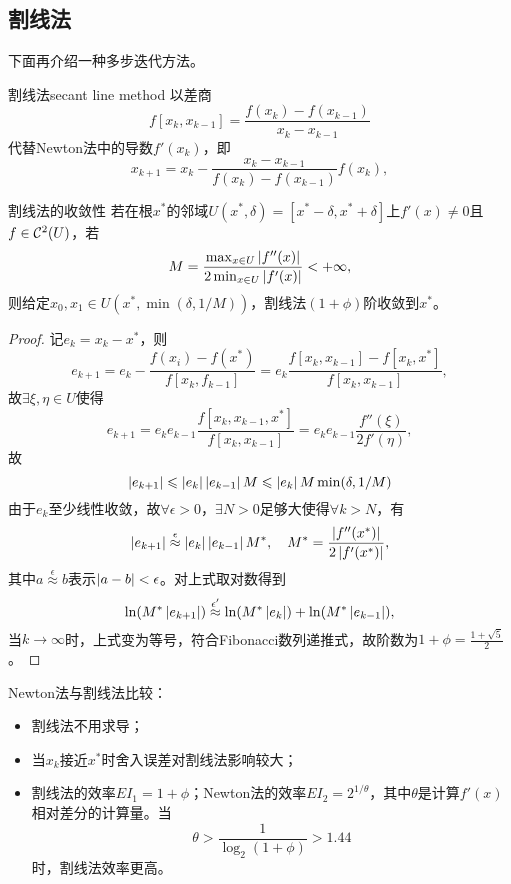 \subsection{割线法}

下面再介绍一种多步迭代方法。

\begin{theorem}
    {割线法}{secant line method}
    以差商
    \[
        f[x_k,x_{k-1}]=\frac{f(x_k)-f(x_{k-1})}{x_k-x_{k-1}}
    \]
    代替Newton法中的导数$f'(x_k)$，即
    \begin{equation}
        \label{eqn:secant line}
        x_{k+1}=x_k-\frac{x_k-x_{k-1}}{f(x_k)-f(x_{k-1})}f(x_k),
    \end{equation}
\end{theorem}

\begin{theorem}
    {割线法的收敛性}{}
    若在根$x^*$的邻域$U(x^*,\delta)=[x^*-\delta,x^*+\delta]$上$f'(x)\neq 0$且$f\in\mathcal C^2(U)$，若
    \[
        M=\frac{\max_{x\in U}\left\lvert f''(x)\right\rvert}{2\min_{x\in U}\left\lvert f'(x)\right\rvert}<+\infty,
    \]
    则给定$x_0,x_1\in U(x^*,\min(\delta,1/M))$，割线法$(1+\phi)$阶收敛到$x^*$。
\end{theorem}

\begin{proof}
    记$e_k=x_k-x^*$，则 
    \[
        e_{k+1}=e_k-\frac{f(x_i)-f(x^*)}{f[x_k,f_{k-1}]}=e_k\frac{f[x_k,x_{k-1}]-f[x_k,x^*]}{f[x_k,x_{k-1}]},
    \]
    故$\exists\xi,\eta\in U$使得
    \[
        e_{k+1}=e_ke_{k-1}\frac{f[x_k,x_{k-1},x^*]}{f[x_k,x_{k-1}]}=e_ke_{k-1}\frac{f''(\xi)}{2f'(\eta)},
    \]
    故
    \[
        \left\lvert e_{k+1}\right\rvert\leqslant\left\lvert e_k\right\rvert\left\lvert e_{k-1}\right\rvert M\leqslant\left\lvert e_k\right\rvert M\min(\delta,1/M)
    \]
    由于$e_k$至少线性收敛，故$\forall\epsilon>0$，$\exists N>0$足够大使得$\forall k>N$，有
    \[
        \left\lvert e_{k+1}\right\rvert\overset\epsilon\approx\left\lvert e_k\right\rvert\left\lvert e_{k-1}\right\rvert M^*,\quad M^*=\frac{\left\lvert f''(x^*)\right\rvert}{2\left\lvert f'(x^*)\right\rvert},
    \]
    其中$a\overset\epsilon\approx b$表示$\left\lvert a-b\right\rvert<\epsilon$。对上式取对数得到
    \[
        \ln(M^*\left\lvert e_{k+1}\right\rvert)\overset{\epsilon'}\approx\ln(M^*\left\lvert e_k\right\rvert)+\ln(M^*\left\lvert e_{k-1}\right\rvert),
    \]
    当$k\to\infty$时，上式变为等号，符合Fibonacci数列递推式，故阶数为$1+\phi=\frac{1+\sqrt5}2$。
\end{proof}

\begin{remark}
    Newton法与割线法比较：
    \begin{itemize}
        \item 割线法不用求导；
        \item 当$x_k$接近$x^*$时舍入误差对割线法影响较大；
        \item 割线法的效率$EI_1=1+\phi$；Newton法的效率$EI_2=2^{1/\theta}$，其中$\theta$是计算$f'(x)$相对差分的计算量。当
        \[
            \theta>\frac1{\log_2(1+\phi)}>1.44
        \]
        时，割线法效率更高。
    \end{itemize}
\end{remark}

